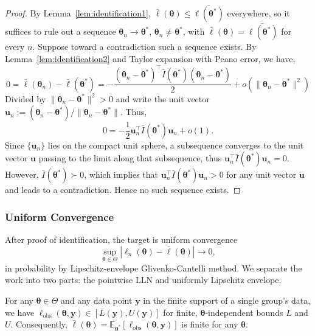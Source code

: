 \begin{proof}
    By Lemma~\ref{lem:identification1}, $\bar{\ell}(\bm{\theta})\leq \bar{\ell(\bm{\theta^{*}})}$ everywhere, so it suffices to rule out a sequence $\bm{\theta}_{n}\to \bm{\theta}^{*}$, $\bm{\theta}_{n}\neq \bm{\theta}^{*}$, with $\bar{\ell}(\bm{\theta})= \bar{\ell(\bm{\theta^{*}})}$ for every $n$. Suppose toward a contradiction such a sequence exists. By Lemma~\ref{lem:identification2} and Taylor expansion with Peano error, we have,
    \begin{equation*}
        0=\bar{\ell}(\bm{\theta}_{n})-\bar{\ell}(\bm{\theta}^{*})=-\dfrac{\left(\bm{\theta}_{n}-\bm{\theta}^{*}\right)^{\top}\bar{I}(\bm{\theta}^{*})\left(\bm{\theta}_{n}-\bm{\theta}^{*}\right)}{2}+o\left(\|\bm{\theta}_{n}-\bm{\theta}^{*}\|^{2}\right)
    \end{equation*}
    Divided by $\|\bm{\theta}_{n}-\bm{\theta}^{*}\|^{2}>0$ and write the unit vector  $\bm{u}_{n}:=\left(\bm{\theta}_{n}-\bm{\theta}^{*}\right)/\|\bm{\theta}_{n}-\bm{\theta}^{*}\|$. Thus,
    \begin{equation*}
        0=-\dfrac{1}{2}\bm{u}_{n}^{\top}\bar{I}(\bm{\theta}^{*})\bm{u}_{n}+o(1).
    \end{equation*}
    Since $\{\bm{u}_{n}\}$ lies on the compact unit sphere, a subsequence converges to the unit vector $\bm{u}$ passing to the limit along that subsequence, thus $\bm{u}_{n}^{\top}\bar{I}(\bm{\theta}^{*})\bm{u}_{n}=0$. However, $\bar{I}(\bm{\theta}^{*})\succ 0$, which implies that $\bm{u}_{n}^{\top}\bar{I}(\bm{\theta}^{*})\bm{u}_{n}>0$ for any unit vector $\bm{u}$ and leads to a contradiction. Hence no such sequence exists. 
\end{proof}

\iffalse
\subsubsection{Uniform Convergence}

After proof of identification, the target is uniform convergence 
\begin{equation}
    \sup_{\bm{\theta}\in \Theta}|\ell_{n}\left(\bm{\theta}\right)-\bar{\ell}\left(\bm{\theta}\right)|\to 0,
\end{equation}
in probability by Lipschitz-envelope Glivenko-Cantelli method. We separate the work into two parts: the pointwise LLN and uniformly Lipschitz envelope.

\begin{lemma}
    For any $\bm{\theta}\in \Theta$ and any data point $\bm{y}$ in the finite support of a single group's data, we have $\ell_{\text{obs}}\left(\bm{\theta},\bm{y}\right)\in \left[L\left(\bm{y}\right), U\left(\bm{y}\right)\right]$ for finite, $\bm{\theta}$-independent bounds $L$ and $U$. Consequently, $\bar{\ell}(\bm{\theta})=\mathbb{E}_{\bm{\theta}^{*}}[\ell_{\text{obs}}(\bm{\theta},\bm{y})]$ is finite for any $\bm{\theta}$.
    \label{lem:uniconverge1}
\end{lemma}

